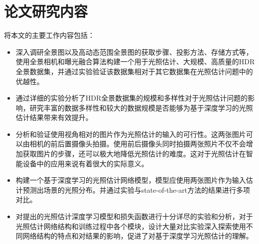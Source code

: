 \section{论文研究内容}
将本文的主要工作内容包括：
\begin{itemize}
    \item 深入调研全景图以及高动态范围全景图的获取步骤、投影方法、存储方式等，使用全景相机和曝光融合算法构建一个用于光照估计、大规模、高质量的HDR全景数据集，并通过实验验证该数据集相对于其它数据集在光照估计问题中的优越性。
    \item 通过详细的实验分析了HDR全景数据集的规模和多样性对于光照估计问题的影响，研究丰富的数据多样性和较大的数据规模是否能够为基于深度学习的光照估计结果带来有效提升。
    \item 分析和验证使用视角相对的图片作为光照估计的输入的可行性。这两张图片可以由相机的前后置摄像头拍摄。使用前后摄像头同时拍摄两张照片不仅不会增加获取图片的步骤，还可以极大地降低光照估计的难度。这对于光照估计在智能设备中的应用来说有着很大的实际意义。
    \item 构建一个基于深度学习的光照估计网络模型，模型应使用两张图片作为输入估计预测出场景的光照分布。并通过实验与state-of-the-art方法的结果进行多项对比。
    \item 对提出的光照估计深度学习模型和损失函数进行十分详尽的实验和分析，对于光照估计网络结构和训练过程中各个模块，设计大量对比实验深入探索使用不同网络结构的特点和对结果的影响，促进了对基于深度学习光照估计的理解。
\end{itemize}
